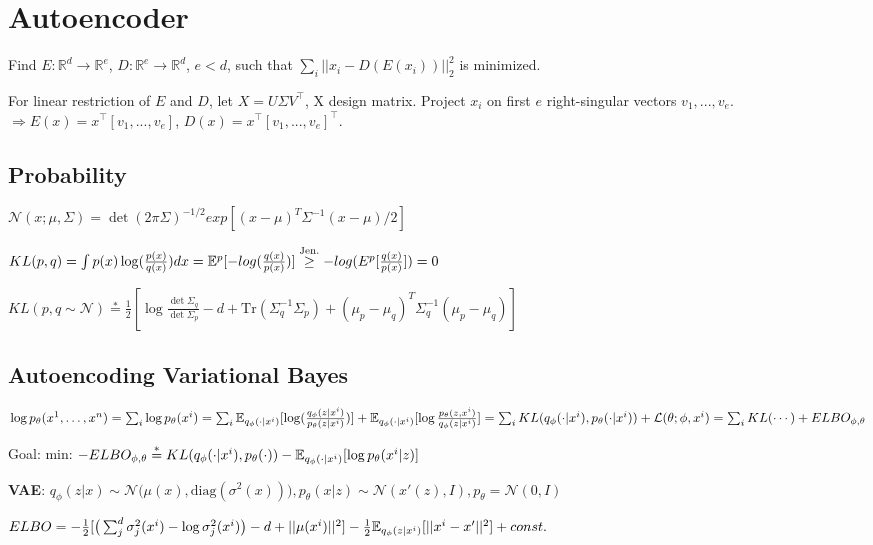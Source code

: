 \section*{Autoencoder}
Find $E:\mathbb{R}^d \rightarrow \mathbb{R}^e$, $D:\mathbb{R}^e \rightarrow \mathbb{R}^d$, $e < d$, such that $\sum_i||x_i - D(E(x_i))||^2_2$ is minimized. 

For linear restriction of $E$ and $D$, let $X = U \Sigma V^{\top}$, X design matrix.
Project $x_i$ on first $e$ right-singular vectors $v_1, ..., v_e$.\\
$\Rightarrow  E(x) = x^{\top} [v_1, ..., v_e]$, $D(x) = x^{\top} [v_1, ..., v_e]^{\top}$.

\subsection*{Probability}
$\mathcal{N}(x;\mu,\Sigma)=\det(2\pi\Sigma)^{-1/2}exp[(x-\mu)^T\Sigma^{-1}(x-\mu)/2]$

$KL(p,q)=\int p(x)\log(\frac{p(x)}{q(x)})dx=\mathbb{E}^{p}[-log(\frac{q(x)}{p(x)})]\stackrel{\text{Jen.}}{\geq}-log(E^{p}[\frac{q(x)}{p(x)}])=0$

$KL(p,q\sim\mathcal{N})\stackrel{*}{=}\frac{1}{2}[\log\frac{\det\Sigma_q}{\det\Sigma_p}-d+\text{Tr}(\Sigma_q^{-1}\Sigma_p)+(\mu_p-\mu_q)^T\Sigma_q^{-1}(\mu_p-\mu_q)]$
\subsection*{Autoencoding Variational Bayes$\;\;\;$}
$\log p_{\theta}(x^{1},\dots,x^n)=\sum_i\log p_{\theta}(x^{i})=\sum_i\mathbb{E}_{q_{\phi}(\cdot|x^i)}[\log(\frac{q_{\phi}(z|x^i)}{p_{\theta}(z|x^i)})]+\mathbb{E}_{q_{\phi}(\cdot|x^i)}[\log\frac{p_{\theta}(z,x^i)}{q_{\phi}(z|x^i)}]=\sum_i KL(q_{\phi}(\cdot|x^i),p_{\theta}(\cdot|x^i))+\mathcal{L}(\theta;\phi,x^i)=\sum_i KL(\cdots)+ELBO_{\phi,\theta}$

Goal: min: $-ELBO_{\phi,\theta}\stackrel{*}{=}KL(q_{\phi}(\cdot|x^i),p_{\theta}(\cdot))-\mathbb{E}_{q_{\phi}(\cdot|x^i)}[\log p_{\theta}(x^i|z)]$

\textbf{VAE}: $q_{\phi}(z|x)\sim\mathcal{N}\big(\mu(x),\text{diag}(\sigma^2(x))\big),p_{\theta}(x|z)\sim\mathcal{N}(x'(z),I),p_{\theta}=\mathcal{N}(0,I)$

$ELBO=-\frac{1}{2}[\big(\sum^d_j \sigma^2_j(x^i)-\log\sigma^2_j(x^i)\big)-d+||\mu(x^i)||^2]-\frac{1}{2}\mathbb{E}_{q_{\phi}(z|x^i)}[||x^i-x'||^2]+const.$

